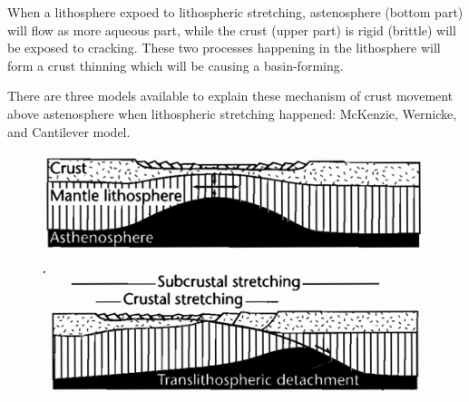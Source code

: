 \documentclass[
  letterpaper,
  DIV=11,
  numbers=noendperiod,
  oneside]{scrreprt}
\begin{document}
When a lithosphere expoed to lithospheric stretching, astenosphere
(bottom part) will flow as more aqueous part, while the crust (upper
part) is rigid (brittle) will be exposed to cracking. These two
processes happening in the lithosphere will form a crust thinning which
will be causing a basin-forming.

There are three models available to explain these mechanism of crust
movement above astenosphere when lithospheric stretching happened:
McKenzie, Wernicke, and Cantilever model.

\begin{figure}


\includegraphics[width=6.78125in,height=\textheight]{./images/image-1782529132.png} \hfill{}

\end{figure}

\begin{figure}


\includegraphics[width=6.83333in,height=\textheight]{./images/image-1735692408.png} \hfill{}

\end{figure}
\end{document}

